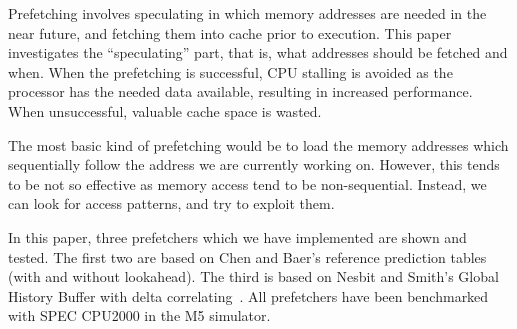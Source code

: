 Prefetching involves speculating in which memory addresses are needed
in the near future, and fetching them into cache prior to
execution. This paper investigates the ``speculating'' part, that is,
what addresses should be fetched and when. When the prefetching is
successful, CPU stalling is avoided as the processor has the needed
data available, resulting in increased performance. When unsuccessful,
valuable cache space is wasted.

The most basic kind of prefetching would be to load the memory
addresses which sequentially follow the address we are currently
working on. However, this tends to be not so effective as memory
access tend to be non-sequential. Instead, we can look for access
patterns, and try to exploit them.

In this paper, three prefetchers which we have implemented are shown
and tested. The first two are based on Chen and Baer's reference
prediction tables~\cite{chen_baer_1995} (with and without
lookahead). The third is based on Nesbit and Smith's Global History
Buffer with delta correlating~\cite{nesbit_smith_2005}. All
prefetchers have been benchmarked with SPEC CPU2000 in the M5
simulator.

